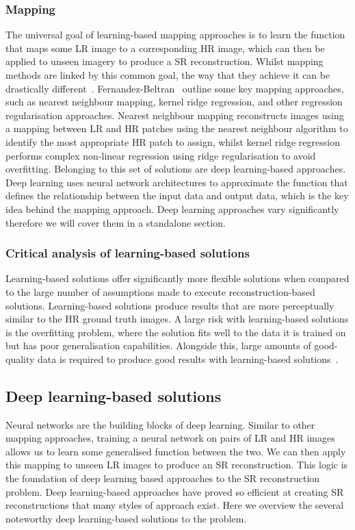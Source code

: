 \subsubsection{Mapping}
The universal goal of learning-based mapping approaches is to learn the function that maps some LR image to a corresponding HR image, which can then be applied to unseen imagery to produce a SR reconstruction. Whilst mapping methods are linked by this common goal, the way that they achieve it can be drastically different~\cite{superResRemoteSensingOverview}. Fernandez-Beltran \etal\ outline some key mapping approaches, such as nearest neighbour mapping, kernel ridge regression, and other regression regularisation approaches. Nearest neighbour mapping reconstructs images using a mapping between LR and HR patches using the nearest neighbour algorithm to identify the most appropriate HR patch to assign, whilst kernel ridge regression performs complex non-linear regression using ridge regularisation to avoid overfitting. Belonging to this set of solutions are deep learning-based approaches. Deep learning uses neural network architectures to approximate the function that defines the relationship between the input data and output data, which is the key idea behind the mapping approach. Deep learning approaches vary significantly therefore we will cover them in a standalone section.

\subsubsection{Critical analysis of learning-based solutions}
Learning-based solutions offer significantly more flexible solutions when compared to the large number of assumptions made to execute reconstruction-based solutions. Learning-based solutions produce results that are more perceptually similar to the HR ground truth images. A large risk with learning-based solutions is the overfitting problem, where the solution fits well to the data it is trained on but has poor generalisation capabilities. Alongside this, large amounts of good-quality data is required to produce good results with learning-based solutions~\cite{superResRemoteSensingOverview}.

\subsection{Deep learning-based solutions}
Neural networks are the building blocks of deep learning. Similar to other mapping approaches, training a neural network on pairs of LR and HR images allows us to learn some generalised function between the two. We can then apply this mapping to unseen LR images to produce an SR reconstruction. This logic is the foundation of deep learning based approaches to the SR reconstruction problem. Deep learning-based approaches have proved so efficient at creating SR reconstructions that many styles of approach exist. Here we overview the several noteworthy deep learning-based solutions to the problem.

